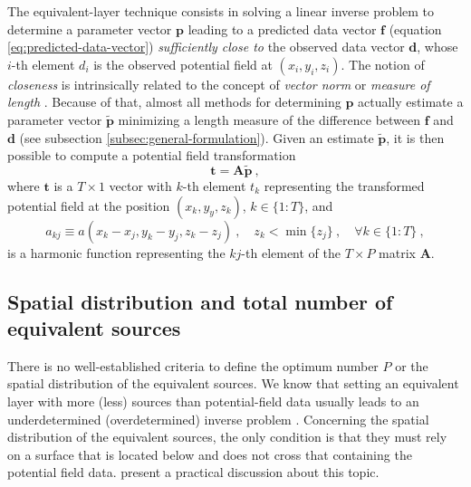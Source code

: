 The equivalent-layer technique consists in solving a linear inverse problem to determine a parameter vector $\mathbf{p}$ 
leading to a predicted data vector $\mathbf{f}$ (equation \ref{eq:predicted-data-vector}) \textit{sufficiently close to} the 
observed data vector $\mathbf{d}$, whose $i$-th element $d_{i}$ is the observed potential field at $(x_{i}, y_{i}, z_{i})$.
The notion of \textit{closeness} is intrinsically related to the concept of \textit{vector norm} \cite[e.g.,][p. 68]{golub-vanloan2013}
or \textit{measure of length} \cite[e.g.,][p. 41]{menke2018}.
Because of that, almost all methods for determining $\mathbf{p}$ actually estimate a parameter 
vector $\tilde{\mathbf{p}}$ minimizing a length measure of the difference between $\mathbf{f}$ and $\mathbf{d}$
(see subsection \ref{subsec:general-formulation}).
Given an estimate $\tilde{\mathbf{p}}$, it is then possible to compute a potential field transformation 
\begin{equation}
	\mathbf{t} = \mathbf{A} \tilde{\mathbf{p}} \: ,
	\label{eq:transformation}
\end{equation}
where $\mathbf{t}$ is a $T \times 1$ vector with $k$-th element $t_{k}$ representing the transformed potential field at
the position $(x_{k}, y_{y}, z_{k})$, $k \in \{1:T\}$, and
\begin{equation}
	a_{kj} \equiv a(x_{k} - x_{j}, y_{k} - y_{j}, z_{k} - z_{j}) \: ,
	\quad z_{k} < \min\{z_{j}\} \: , \quad \forall k \in \{1:T\} \: ,
	\label{eq:harmonic-function-a-kj}
\end{equation}
is a harmonic function representing the $kj$-th element of the $T \times P$ matrix $\mathbf{A}$.

\subsection{Spatial distribution and total number of equivalent sources}
\label{subsec:spatial-distribution-sources}

There is no well-established criteria to define the optimum number $P$ or the spatial distribution
of the equivalent sources. We know that setting an equivalent layer with more (less) sources than potential-field 
data usually leads to an underdetermined (overdetermined) inverse problem \cite[e.g.,][ p. 52--53]{menke2018}.
Concerning the spatial distribution of the equivalent sources, the only condition is that they must rely on a 
surface that is located below and does not cross that containing the potential field data.
\citet{soler-uieda2021} present a practical discussion about this topic.

